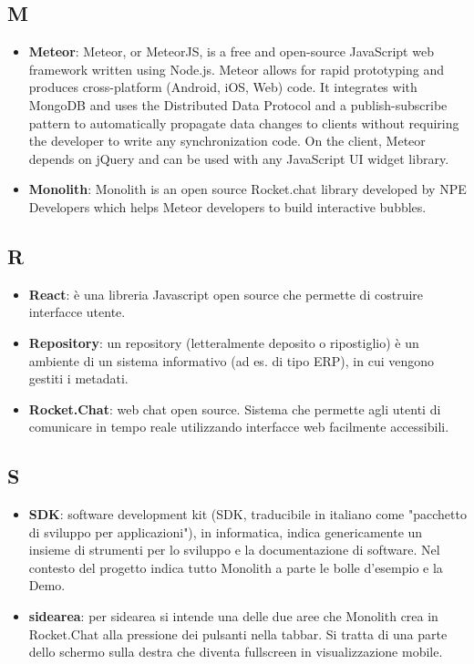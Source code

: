 \subsection*{M}
\begin{itemize}
	\item
	\textbf{Meteor}: Meteor, or MeteorJS, is a free and open-source JavaScript web framework written using Node.js. Meteor allows for rapid prototyping and produces cross-platform (Android, iOS, Web) code. It integrates with MongoDB and uses the Distributed Data Protocol and a publish-subscribe pattern to automatically propagate data changes to clients without requiring the developer to write any synchronization code. On the client, Meteor depends on jQuery and can be used with any JavaScript UI widget library.
	\item
	\textbf{Monolith}: Monolith is an open source Rocket.chat library developed by NPE Developers which helps Meteor developers to build interactive bubbles.
\end{itemize}
\newpage

\subsection*{R}
\begin{itemize}
	\item
    \textbf{React}: è una libreria Javascript open source che permette di costruire interfacce utente.
    \item
    \textbf{Repository}: un repository (letteralmente deposito o ripostiglio) è un ambiente di un sistema informativo (ad es. di tipo ERP), in cui vengono gestiti i metadati.
	\item
	\textbf{Rocket.Chat}: web chat open source. Sistema che permette agli utenti di comunicare in tempo reale utilizzando interfacce web facilmente accessibili.
\end{itemize}
\newpage

\subsection*{S}
\begin{itemize}
	\item
	\textbf{SDK}: software development kit (SDK, traducibile in italiano come "pacchetto di sviluppo per applicazioni"), in informatica, indica genericamente un insieme di strumenti per lo sviluppo e la documentazione di software. Nel contesto del progetto indica tutto Monolith a parte le bolle d'esempio e la Demo.
	\item
    \textbf{sidearea}: per sidearea si intende una delle due aree che Monolith crea in Rocket.Chat alla pressione dei pulsanti nella tabbar. Si tratta di una parte dello schermo sulla destra che diventa fullscreen in visualizzazione mobile.
\end{itemize}
\newpage

